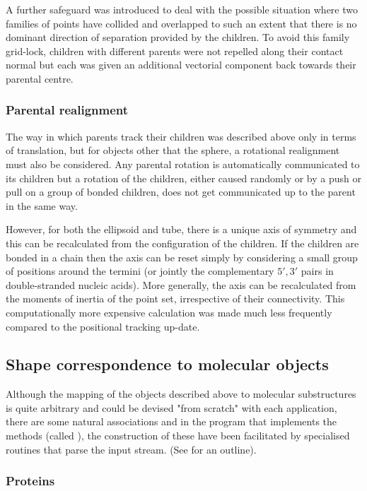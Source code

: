 A further safeguard was introduced to deal with the possible situation where two
families of points have collided and overlapped to such an extent that there is no
dominant direction of separation provided by the children.   To avoid this family
grid-lock, children with different parents were not repelled along their contact
normal but each was given an additional vectorial component back towards their
parental centre.

\subsubsection{Parental realignment}

The way in which parents track their children was described above only in terms of
translation, but for objects other that the sphere, a rotational realignment must also
be considered.   Any parental rotation is automatically communicated to its children but
a rotation of the children, either caused randomly or by a push or pull on a group of
bonded children, does not get communicated up to the parent in the same way.

However, for both the ellipsoid and tube, there is a unique axis of symmetry and this can
be recalculated from the configuration of the children.  If the children are bonded
in a chain then the axis can be reset simply by considering a small group of positions
around the termini (or jointly the complementary $5',3'$ pairs in double-stranded
nucleic acids).   More generally, the axis can be recalculated from the moments
of inertia of the point set, irrespective of their connectivity.
This computationally more expensive calculation was made much less frequently
compared to the positional tracking up-date. 

\subsection{Shape correspondence to molecular objects}

Although the mapping of the objects described above to molecular substructures is quite
arbitrary and could be devised "from scratch" with each application, there are some
natural associations and in the program that implements the methods (called \NAME),
the construction of these have been facilitated by specialised routines that parse
the input stream. (See \cite{TaylorWRet12c} for an outline).

\subsubsection{Proteins}

